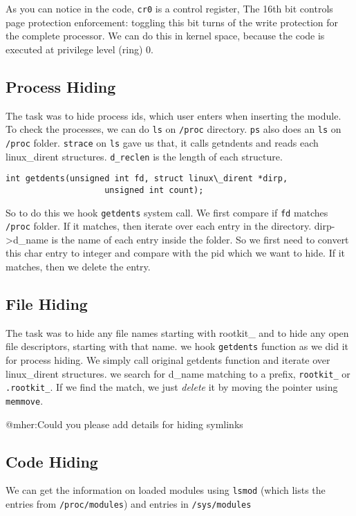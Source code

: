 \documentclass[10pt, letterpaper]{scrartcl}
\begin{document}
As you can notice in the code, \texttt{cr0} is a control register, 
The 16th bit controls page protection enforcement: 
toggling this bit turns of the write protection for the complete processor.
We can do this in kernel space, because the code is executed at privilege level (ring) 0. 

\subsection{Process Hiding}
The task was to hide process ids, which user enters when inserting the module. 
To check the processes, we can do \texttt{ls} on \texttt{/proc} directory. 
\texttt{ps} also does an \texttt{ls} on \texttt{/proc} folder.   
\texttt{strace} on \texttt{ls} gave us that, it calls getndents and reads each linux\_dirent structures. 
\texttt{d\_reclen} is the length of each structure. 

\begin{verbatim}
int getdents(unsigned int fd, struct linux\_dirent *dirp,
                    unsigned int count);
\end{verbatim}


So to do this we hook \texttt{getdents} system call. 
We first compare if \texttt{fd} matches \texttt{/proc} folder. 
If it matches, then iterate over each entry in the directory.
dirp->d\_name is the name of each entry inside the folder. 
So we first need to convert this char entry to integer and compare with the pid which we want to hide.
If it matches, then we delete the entry. 

\subsection{File Hiding}
The task was to hide any file names starting with rootkit\_ and to hide any open file descriptors, 
starting with that name. we hook \texttt{getdents} function as we did it for process hiding. 
We simply call original getdents function and iterate over linux\_dirent structures.
we search for d\_name matching to a prefix, \texttt{rootkit\_} or \texttt{.rootkit\_}. 
If we find the match, we just {\em delete} it by moving the pointer using \texttt{memmove}.

@mher:Could you please add details for hiding symlinks 

\subsection{Code Hiding}
We can get the information on loaded modules using \texttt{lsmod}
(which lists the entries from \texttt{/proc/modules}) and entries in \texttt{/sys/modules}
\end{document}
